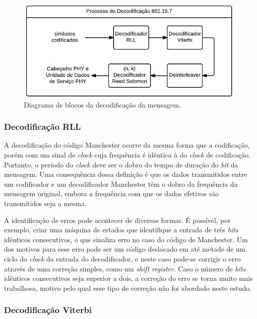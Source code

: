 	\begin{figure}[!htb]
		\caption{\label{fig_reception_phy1}Diagrama de blocos da decodificação da mensagem.}
		\centering
		\includegraphics[width=0.4\textheight]{PHY1-reception.pdf}
	\end{figure}

	\subsubsection*{Decodificação RLL}

	A decodificação do código Manchester ocorre da mesma forma que a codificação, porém com um sinal de \textit{clock} cuja frequência é idêntica à do \textit{clock} de codificação. Portanto, o período do \textit{clock} deve ser o dobro do tempo de duração do \textit{bit} da mensagem. Uma consequência dessa definição é que os dados transmitidos entre um codificador e um decodificador Manchester têm o dobro da frequência da mensagem original, embora a frequência com que os dados efetivos são transmitidos seja a mesma.

	A identificação de erros pode acontecer de diversas formas. É possível, por exemplo, criar uma máquina de estados que identifique a entrada de três \textit{bits} idênticos consecutivos, o que sinaliza erro no caso do código de Manchester. Um dos motivos para esse erro pode ser um código deslocado em até metade de um ciclo do \textit{clock} da entrada do decodificador, e neste caso pode-se corrigir o erro através de uma correção simples, como um \textit{shift register}. Caso o número de \textit{bits} idênticos consecutivos seja superior a dois, a correção do erro se torna muito mais trabalhosa, motivo pelo qual esse tipo de correção não foi abordado neste estudo.

	\subsubsection*{Decodificação Viterbi}\label{section:method-viterbi}

